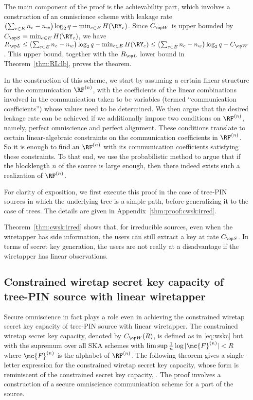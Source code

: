 \begin{IEEEproof}
The main component of the proof is the achievability part, which involves a construction of an omniscience scheme with leakage rate $ \left(\sum_{e \in E}n_e -n_w\right)\log_2q - \min_{e \in E} H(\RY_e)$. Since $\wskc$ is upper bounded by $\skc = \min_{e \in E} H(\RY_e)$, we have $ \rl \leq \left(\sum_{e \in E}n_e -n_w\right)\log_2q - \min_{e \in E} H(\RY_e) \leq \left(\sum_{e \in E}n_e -n_w\right)\log_2q- \wskc$.  This upper bound, together with the $\rl$ lower bound in Theorem~\ref{thm:RL:lb}, proves the theorem.

In the construction of this scheme, we start by assuming a certain linear structure for the communication $\RF^{(n)}$, with the coefficients of the linear combinations involved in the communication taken to be variables (termed ``communication coefficients'') whose values need to be determined. We then argue that the desired leakage rate can be achieved if we additionally impose two conditions on $\RF^{(n)}$, namely, perfect omniscience and perfect alignment. These conditions translate to certain linear-algebraic constraints on the communication coefficients in $\RF^{(n)}$. So it is enough to find an $\RF^{(n)}$ with its communication coefficients satisfying these constraints. To that end, we use the probabilistic method to argue that if the blocklength $n$ of the source is large enough, then there indeed exists such a realization of $\RF^{(n)}$. 

For clarity of exposition, we first execute this proof in the case of tree-PIN sources in which the underlying tree is a simple path, before generalizing it to the case of trees. The details are given in Appendix~\ref{thm:proof:cwsk:irred}.
\end{IEEEproof}


Theorem~\ref{thm:cwsk:irred} shows that, for irreducible sources, even when the wiretapper has side information, the users can still extract a key at rate $\skc$. In terms of secret key generation, the users are not really at a disadvantage if the wiretapper has linear observations.

\subsection{Constrained wiretap secret key capacity of tree-PIN source with linear wiretapper}
Secure omniscience in fact plays a role even in achieving the constrained wiretap secret key capacity of tree-PIN source with linear wiretapper. The constrained wiretap secret key capacity, denoted by $\wskc(R)$, is defined as in \eqref{eq:wskc} but with the supremum over all SKA schemes with $\limsup\frac{1}{n}\log|\mc{F}^{(n)}|<R$ where $\mc{F}^{(n)}$ is the alphabet of $\RF^{(n)}$. The following theorem gives a single-letter expression for the constrained wiretap secret key capacity, whose form is reminiscent of the constrained secret key capacity, \cite[Theorem~4.2]{chan19}. The proof involves a construction of a secure omniscience communication scheme for a part of the source.

